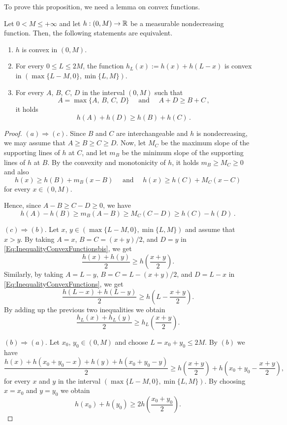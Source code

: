 To prove this proposition, we need a lemma on convex functions. 


\begin{lemma}
	\label{Lemma:ConvexFunctions}
	Let $0<M\leq +\infty$ and let $h:(0,M)\to \mathbb{R}$ be a measurable nondecreasing function. Then, the following statements are equivalent.
	
	\begin{enumerate}[label=(\alph*)]
		\item $h$ is convex in $(0,M)$.
		
		\item For every $0\leq L\leq 2M$, the function $h_L (x) := h(x) + h(L-x)$ is convex in $(\max \{L-M,0\}, \min \{L,M\})$.
		
		\item For every $A$, $B$, $C$, $D$ in the interval $(0,M)$ such that
		$$
		A = \max\{A,\, B,\, C,\, D\} \quad \text{ and } \quad A + D \geq B + C\,,
		$$
		it holds
		\begin{equation}
			\label{Eq:InequalityConvexFunctionsbis}
			h(A) + h(D) \geq h(B) + h(C)\,.
		\end{equation}
	\end{enumerate}
\end{lemma}

\begin{proof}
	$(a)\Rightarrow (c)$.	Since $B$ and $C$ are interchangeable and $h$ is nondecreasing, we may assume that $A \geq B \geq C \geq D$. Now, let $M_C$ be the maximum slope of the supporting lines of $h$ at $C$, and let $m_B$ be the minimum slope of the supporting lines of $h$ at $B$. By the convexity and monotonicity of $h$, it holds $m_B \geq M_C\geq 0$ and also
	$$
	h(x) \geq h(B) + m_B (x-B) \quad \text{ and } \quad h(x) \geq h(C) + M_C (x-C) 
	$$
	for every $x \in (0,M)$.
	
	Hence, since $A-B \geq C-D\geq 0$, we have
	$$
	h(A)-h(B) \geq m_B(A-B) \geq M_C (C-D) \geq h(C) - h(D)\,.
	$$
	
	$(c) \Rightarrow (b)$. Let $x$, $y\in (\max \{L-M,0\}, \min \{L,M\})$ and assume that $x>y$. By taking $A=x$, $B=C=(x+y)/2$, and $D = y$ in \eqref{Eq:InequalityConvexFunctionsbis}, we get 
	$$
	\dfrac{h(x) + h(y)}{2} \geq h \left( \dfrac{x+y}{2}\right). 
	$$ 
	Similarly, by taking $A= L-y$, $B=C=L -(x+y)/2$, and $D = L-x$ in \eqref{Eq:InequalityConvexFunctions}, we get 
	$$
	\dfrac{h(L-x) + h(L-y)}{2} \geq h \left(L - \dfrac{x+y}{2}\right). 
	$$
	By adding up the previous two inequalities we obtain
	$$
	\dfrac{h_L(x) + h_L(y)}{2} \geq h_L \left( \dfrac{x+y}{2}\right). 
	$$ 
	
	$(b) \Rightarrow (a)$. Let $x_0$, $y_0 \in (0,M)$ and choose $L = x_0 + y_0 \leq 2M$. By $(b)$ we have 
	$$
	\dfrac{h(x) + h(x_0 + y_0-x) + h(y) + h(x_0 + y_0-y)}{2} \geq h \left( \dfrac{x+y}{2}\right) + h \left(x_0 + y_0 - \dfrac{x+y}{2}\right),
	$$
	for every $x$ and $y$ in the interval $(\max \{L-M,0\}, \min \{L,M\})$. By choosing $x=x_0$ and $y=y_0$ we obtain
	$$
	h(x_0) + h(y_0)\geq 2 h \left( \dfrac{x_0+y_0}{2}\right). 
	$$
\end{proof}


